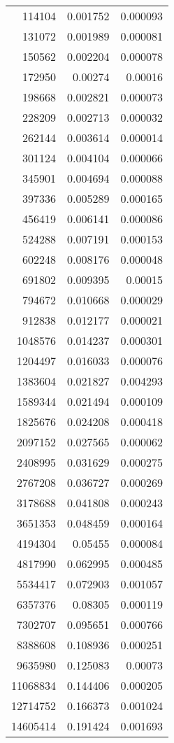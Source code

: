 \begin{longtable}{r r r}
114104 & 0.001752 & 0.000093 \\
131072 & 0.001989 & 0.000081 \\
150562 & 0.002204 & 0.000078 \\
172950 & 0.00274 & 0.00016 \\
198668 & 0.002821 & 0.000073 \\
228209 & 0.002713 & 0.000032 \\
262144 & 0.003614 & 0.000014 \\
301124 & 0.004104 & 0.000066 \\
345901 & 0.004694 & 0.000088 \\
397336 & 0.005289 & 0.000165 \\
456419 & 0.006141 & 0.000086 \\
524288 & 0.007191 & 0.000153 \\
602248 & 0.008176 & 0.000048 \\
691802 & 0.009395 & 0.00015 \\
794672 & 0.010668 & 0.000029 \\
912838 & 0.012177 & 0.000021 \\
1048576 & 0.014237 & 0.000301 \\
1204497 & 0.016033 & 0.000076 \\
1383604 & 0.021827 & 0.004293 \\
1589344 & 0.021494 & 0.000109 \\
1825676 & 0.024208 & 0.000418 \\
2097152 & 0.027565 & 0.000062 \\
2408995 & 0.031629 & 0.000275 \\
2767208 & 0.036727 & 0.000269 \\
3178688 & 0.041808 & 0.000243 \\
3651353 & 0.048459 & 0.000164 \\
4194304 & 0.05455 & 0.000084 \\
4817990 & 0.062995 & 0.000485 \\
5534417 & 0.072903 & 0.001057 \\
6357376 & 0.08305 & 0.000119 \\
7302707 & 0.095651 & 0.000766 \\
8388608 & 0.108936 & 0.000251 \\
9635980 & 0.125083 & 0.00073 \\
11068834 & 0.144406 & 0.000205 \\
12714752 & 0.166373 & 0.001024 \\
14605414 & 0.191424 & 0.001693 \\

\end{longtable}
